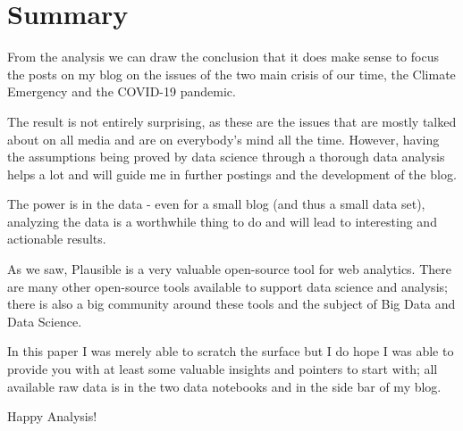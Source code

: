 %
%

\pagebreak
\section{Summary}

\onehalfspacing

From the analysis we can draw the conclusion that it does make sense to focus the posts on my blog on the issues of the two main crisis of our time, the Climate Emergency and the COVID-19 pandemic.

The result is not entirely surprising, as these are the issues that are mostly talked about on all media and are on everybody's mind all the time. However, having the assumptions being proved by data science through a thorough data analysis helps a lot and will guide me in further postings and the development of the blog.

The power is in the data - even for a small blog (and thus a small data set), analyzing the data is a worthwhile thing to do and will lead to interesting and actionable results.

As we saw, Plausible is a very valuable open-source tool for web analytics. There are many other open-source tools available to support data science and analysis; there is also a big community around these tools and the subject of Big Data and Data Science. 

In this paper I was merely able to scratch the surface but I do hope I was able to provide you with at least some valuable insights and pointers to start with; all available raw data is in the two data notebooks and in the side bar of my blog.

Happy Analysis!
